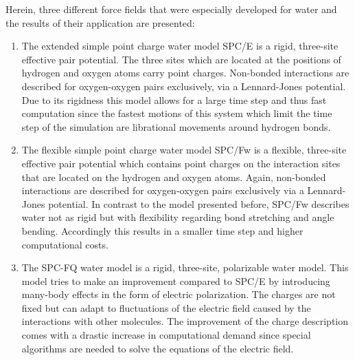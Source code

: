 \documentclass[a4paper,12pt]{scrartcl}
\begin{document}
	Herein, three different force fields that were especially developed for water and the results of their application are presented: 
	\begin{enumerate}
		\item The extended simple point charge water model SPC/E\autocite{berendsen1987missing} is a rigid, three-site effective pair potential. The three sites which are located at the positions of hydrogen and oxygen atoms carry point charges. Non-bonded interactions are described for oxygen-oxygen pairs exclusively, via a Lennard-Jones potential. Due to its rigidness this model allows for a large time step and thus fast computation since the fastest motions of this system which limit the time step of the simulation are librational movements around hydrogen bonds.
		
		\item The flexible simple point charge water model SPC/Fw\autocite{wu2006flexible} is a flexible, three-site effective pair potential which contains point charges on the interaction sites that are located on the hydrogen and oxygen atoms. Again, non-bonded interactions are described for oxygen-oxygen pairs exclusively via a Lennard-Jones potential. In contrast to the model presented before, SPC/Fw describes water not as rigid but with flexibility regarding bond stretching and angle bending. Accordingly this results in a smaller time step and higher computational costs.
		
		\item The SPC-FQ\autocite{rick1994dynamical} water model is a rigid, three-site, polarizable water model. This model tries to make an improvement compared to SPC/E by introducing many-body effects in the form of electric polarization. The charges are not fixed but can adapt to fluctuations of the electric field caused by the interactions with other molecules. The improvement of the charge description comes with a drastic increase in computational demand since special algorithms are needed to solve the equations of the electric field.
	\end{enumerate}

	
	
%
\end{document}
